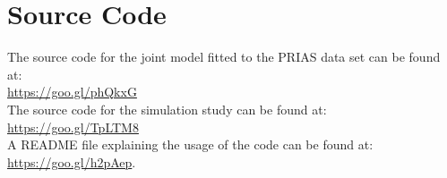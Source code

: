 \section{Source Code}
The source code for the joint model fitted to the PRIAS data set can be found at:\\
\url{https://goo.gl/phQkxG}\\
The source code for the simulation study can be found at:\\
\url{https://goo.gl/TpLTM8}\\
A README file explaining the usage of the code can be found at:\\
\url{https://goo.gl/h2pAep}.\\
